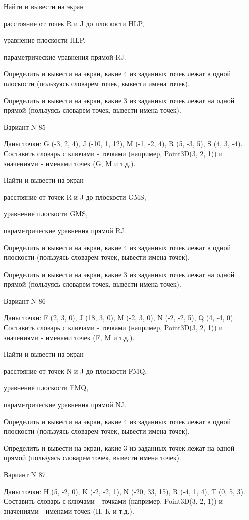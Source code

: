 \documentclass[11pt]{report}
\begin{document}
 
Найти и вывести на экран


расстояние от точек R и J до плоскости HLP,

 
уравнение плоскости HLP,

 
параметрические уравнения прямой RJ.


Определить и вывести на экран, какие 4 из заданных точек лежат в одной плоскости (пользуясь словарем точек, вывести имена точек).


Определить и вывести на экран, какие 3 из заданных точек лежат на одной прямой (пользуясь словарем точек, вывести имена точек).

Вариант N 85

Даны точки: G (-3, 2, 4), J (-10, 1, 12), M (-1, -2, 4), R (5, -3, 5), S (4, 3, -4).
Составить словарь с ключами - точками (например, Point3D(3, 2, 1)) и значениями - именами точек (G, M и т.д.).

 
Найти и вывести на экран


расстояние от точек R и J до плоскости GMS,

 
уравнение плоскости GMS,

 
параметрические уравнения прямой RJ.


Определить и вывести на экран, какие 4 из заданных точек лежат в одной плоскости (пользуясь словарем точек, вывести имена точек).


Определить и вывести на экран, какие 3 из заданных точек лежат на одной прямой (пользуясь словарем точек, вывести имена точек).

Вариант N 86

Даны точки: F (2, 3, 0), J (18, 3, 0), M (-2, 3, 0), N (-2, -2, 5), Q (4, -4, 0).
Составить словарь с ключами - точками (например, Point3D(3, 2, 1)) и значениями - именами точек (F, M и т.д.).

 
Найти и вывести на экран


расстояние от точек N и J до плоскости FMQ,

 
уравнение плоскости FMQ,

 
параметрические уравнения прямой NJ.


Определить и вывести на экран, какие 4 из заданных точек лежат в одной плоскости (пользуясь словарем точек, вывести имена точек).


Определить и вывести на экран, какие 3 из заданных точек лежат на одной прямой (пользуясь словарем точек, вывести имена точек).

Вариант N 87

Даны точки: H (5, -2, 0), K (-2, -2, 1), N (-20, 33, 15), R (-4, 1, 4), T (0, 5, 3).
Составить словарь с ключами - точками (например, Point3D(3, 2, 1)) и значениями - именами точек (H, K и т.д.).
\end{document}
